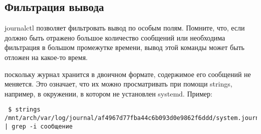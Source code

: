 \documentclass[a4paper,10pt,twoside]{article}
\begin{document}
\subsection{Фильтрация вывода}
journalctl позволяет фильтровать вывод по особым полям. Помните, что, если должно быть отражено большое количество сообщений или необходима фильтрация в большом промежутке времени, вывод этой команды может быть отложен на какое-то время.

 поскольку журнал хранится в двоичном формате, содержимое его сообщений не меняется. Это означает, что их можно просматривать при помощи strings, например, в окружении, в котором не установлен systemd. Пример:
\begin{verbatim}
 $ strings /mnt/arch/var/log/journal/af4967d77fba44c6b093d0e9862f6ddd/system.journal | grep -i сообщение
\end{verbatim} 
\end{document}
